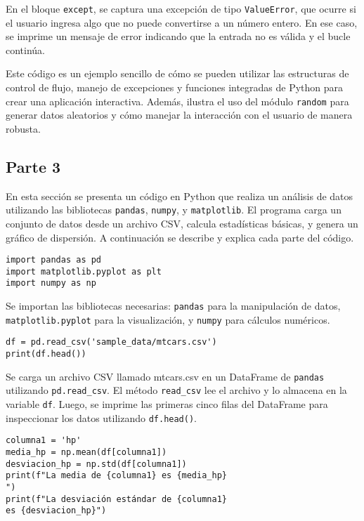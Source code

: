 \documentclass[conference]{IEEEtran}
\begin{document}
En el bloque \texttt{except}, se captura una excepción de tipo \texttt{ValueError}, que ocurre si el usuario ingresa algo que no puede convertirse a un número entero. En ese caso, se imprime un mensaje de error indicando que la entrada no es válida y el bucle continúa.

Este código es un ejemplo sencillo de cómo se pueden utilizar las estructuras de control de flujo, manejo de excepciones y funciones integradas de Python para crear una aplicación interactiva. Además, ilustra el uso del módulo \texttt{random} para generar datos aleatorios y cómo manejar la interacción con el usuario de manera robusta.


\vspace{0.2cm}




\subsection{Parte 3}

En esta sección se presenta un código en Python que realiza un análisis de datos utilizando las bibliotecas \texttt{pandas}, \texttt{numpy}, y \texttt{matplotlib}. El programa carga un conjunto de datos desde un archivo CSV, calcula estadísticas básicas, y genera un gráfico de dispersión. A continuación se describe y explica cada parte del código.

\begin{verbatim}
import pandas as pd
import matplotlib.pyplot as plt
import numpy as np
\end{verbatim}

Se importan las bibliotecas necesarias: \texttt{pandas} para la manipulación de datos, \texttt{matplotlib.pyplot} para la visualización, y \texttt{numpy} para cálculos numéricos.

\begin{verbatim}
df = pd.read_csv('sample_data/mtcars.csv')
print(df.head())
\end{verbatim}

Se carga un archivo CSV llamado mtcars.csv en un DataFrame de \texttt{pandas} utilizando \texttt{pd.read\_csv}.
El método \texttt{read\_csv} lee el archivo y lo almacena en la variable \texttt{df}. Luego, se imprime las primeras cinco filas del DataFrame para inspeccionar los datos utilizando \texttt{df.head()}.

\begin{verbatim}
columna1 = 'hp'
media_hp = np.mean(df[columna1])
desviacion_hp = np.std(df[columna1])
print(f"La media de {columna1} es {media_hp}
")
print(f"La desviación estándar de {columna1}
es {desviacion_hp}")
\end{verbatim}
\end{document}
